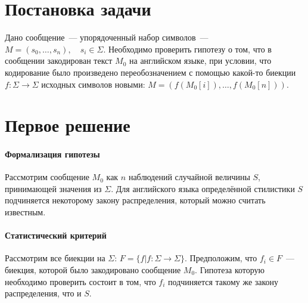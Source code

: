 \documentclass[a4paper,10pt]{article}
\begin{document}
%


\section{Постановка задачи}
Дано сообщение~--- упорядоченный набор символов~--- 
$M = (s_0, \ldots, s_n), \quad s_i \in \Sigma$.
Необходимо проверить гипотезу о том, что в сообщении закодирован текст $M_0$
на английском языке, при условии, что кодирование было произведено 
переобозначением с помощью какой-то биекции 
$f \colon \Sigma \rightarrow \Sigma$ 
исходных символов новыми: 
$M = (f(M_0[i]), \ldots, f(M_0[n]))$.

\section{Первое решение}
\paragraph{Формализация гипотезы}
Рассмотрим сообщение $M_0$ как $n$ наблюдений случайной величины $S$, 
принимающей значения из $\Sigma$.
Для английского языка определённой стилистики $S$ подчиняется некоторому
закону распределения, который можно считать известным.

\paragraph{Статистический критерий}
Рассмотрим все биекции на $\Sigma$: 
$F = \{ f | f \colon \Sigma \rightarrow \Sigma \}$.
Предположим, что $f_i \in F$~--- биекция, которой было закодировано сообщение 
$M_0$.
Гипотеза которую необходимо проверить состоит в том, 
что $f_i$ подчиняется такому же закону распределения, что и $S$.





%
%
\end{document}
